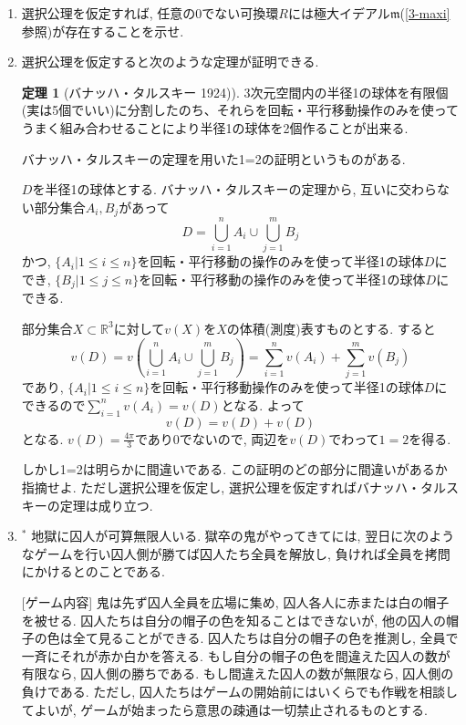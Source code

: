 \documentclass[dvipdfmx,a4paper,11pt]{article}
\newcommand{\R}{\mathbb{R}}
\theoremstyle{definition}
\newtheorem{thm}{定理}
\begin{document}
\begin{enumerate}[label=\textbf{問}\ref*{sec-9}.\arabic*]
  \item 選択公理を仮定すれば, 任意の0でない可換環$R$には極大イデアル$\mathfrak{m}$(\ref{3-maxi}参照)が存在することを示せ.

 
 \item 選択公理を仮定すると次のような定理が証明できる.
\begin{tcolorbox}[
    colback = white,
    colframe = black!35!black,
    fonttitle = \bfseries,
    breakable = true]
    \begin{thm}[バナッハ・タルスキー 1924)]
3次元空間内の半径1の球体を有限個(実は5個でいい)に分割したのち、それらを回転・平行移動操作のみを使ってうまく組み合わせることにより半径1の球体を2個作ることが出来る.
\end{thm}
 \end{tcolorbox}
バナッハ・タルスキーの定理を用いた1=2の証明というものがある.
\begin{tcolorbox}[
    colback = white,
    colframe = black!35!black,
    fonttitle = \bfseries,
    breakable = true]
[証明?] $D$を半径1の球体とする. 
バナッハ・タルスキーの定理から, 互いに交わらない部分集合$A_i, B_j$があって
$$
D = \bigcup_{i=1}^{n} A_i \cup \bigcup_{j=1}^{m} B_j
$$
かつ, $\{A_i | 1 \le i \le n \}$を回転・平行移動の操作のみを使って半径1の球体$D$にでき, $\{B_j | 1 \le j \le n \}$を回転・平行移動の操作のみを使って半径1の球体$D$にできる.

部分集合$X \subset \R^3$に対して$v(X)$を$X$の体積(測度)表すものとする.
すると
$$
v(D) = v\left(\bigcup_{i=1}^{n} A_i \cup \bigcup_{j=1}^{m} B_j\right)
=\sum_{i=1}^{n}v(A_i) + \sum_{j=1}^{m}v(B_j) 
$$
であり, $\{A_i | 1 \le i \le n \}$を回転・平行移動操作のみを使って半径1の球体$D$にできるので$\sum_{i=1}^{n}v(A_i)=v(D)$となる.
よって
$$
v(D) =v(D) + v(D)
$$
となる. 
$v(D)=\frac{4\pi}{3}$であり0でないので, 両辺を$v(D)$でわって$1=2$を得る. 
 \end{tcolorbox}
しかし1=2は明らかに間違いである. 
この証明のどの部分に間違いがあるか指摘せよ. ただし選択公理を仮定し, 選択公理を仮定すればバナッハ・タルスキーの定理は成り立つ. 
 
 \item $^{*}$ 地獄に囚人が可算無限人いる. 獄卒の鬼がやってきてには, 翌日に次のようなゲームを行い囚人側が勝てば囚人たち全員を解放し, 負ければ全員を拷問にかけるとのことである. 

[ゲーム内容]
鬼は先ず囚人全員を広場に集め, 囚人各人に赤または白の帽子を被せる. 囚人たちは自分の帽子の色を知ることはできないが, 他の囚人の帽子の色は全て見ることができる. 囚人たちは自分の帽子の色を推測し, 全員で一斉にそれが赤か白かを答える. もし自分の帽子の色を間違えた囚人の数が有限なら, 囚人側の勝ちである. もし間違えた囚人の数が無限なら, 囚人側の負けである. 
ただし, 囚人たちはゲームの開始前にはいくらでも作戦を相談してよいが, ゲームが始まったら意思の疎通は一切禁止されるものとする.


\end{enumerate}
\end{document}
